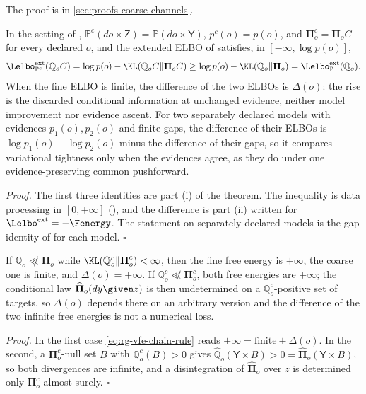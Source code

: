 The proof is in \cref{sec:proofs-coarse-channels}.

\label{eq:cg-fixed-joint-pushforward}
In the setting of , $\mathbb P^c(do\times\mathsf Z)=\mathbb P(do\times\mathsf Y)$,
$p^c(o)=p(o)$, and $\boldsymbol\Pi^c_o=\boldsymbol\Pi_oC$ for every declared $o$, and the extended ELBO
of  satisfies, in $[-\infty,\log p(o)]$,
\begin{equation}
\Lelbo^{\mathrm{ext}}_{\mathbb P^c}(\mathbb Q_oC)
=\log p(o)-\KL(\mathbb Q_oC\Vert\boldsymbol\Pi_oC)
\geq\log p(o)-\KL(\mathbb Q_o\Vert\boldsymbol\Pi_o)
=\Lelbo^{\mathrm{ext}}_{\mathbb P}(\mathbb Q_o).
\label{eq:cg-elbo-monotone}
\end{equation}
When the fine ELBO is finite, the difference of the two ELBOs is $\Delta(o)$: the rise is the
discarded conditional information at unchanged evidence, neither model improvement nor evidence
ascent. For two separately declared models with evidences $p_1(o),p_2(o)$ and finite gaps, the
difference of their ELBOs is $\log p_1(o)-\log p_2(o)$ minus the difference of their gaps, so it
compares variational tightness only when the evidences agree, as they do under one
evidence-preserving common pushforward. 

\noindent\emph{Proof.}
The first three identities are part (i) of the theorem. The inequality is data processing in
$[0,+\infty]$ (), and the difference is part (ii) written for
$\Lelbo^{\mathrm{ext}}=-\Fenergy$. The statement on separately declared models is the gap identity
of  for each model. $\square$

If $\mathbb Q_o\not\ll\boldsymbol\Pi_o$ while $\KL(\mathbb Q^c_o\Vert\boldsymbol\Pi^c_o)<\infty$,
then the fine free energy is $+\infty$, the coarse one is finite, and $\Delta(o)=+\infty$. If
$\mathbb Q^c_o\not\ll\boldsymbol\Pi^c_o$, both free energies are $+\infty$; the conditional law
$\widehat{\boldsymbol\Pi}_o(dy\given z)$ is then undetermined on a $\mathbb Q^c_o$-positive set of
targets, so $\Delta(o)$ depends there on an arbitrary version and the difference of the two
infinite free energies is not a numerical loss. 

\noindent\emph{Proof.}
In the first case \eqref{eq:rg-vfe-chain-rule} reads $+\infty=\text{finite}+\Delta(o)$. In the
second, a $\boldsymbol\Pi^c_o$-null set $B$ with $\mathbb Q^c_o(B)>0$ gives
$\widehat{\mathbb Q}_o(\mathsf Y\times B)>0=\widehat{\boldsymbol\Pi}_o(\mathsf Y\times B)$, so both
divergences are infinite, and a disintegration of $\widehat{\boldsymbol\Pi}_o$ over $z$ is
determined only $\boldsymbol\Pi^c_o$-almost surely. $\square$

